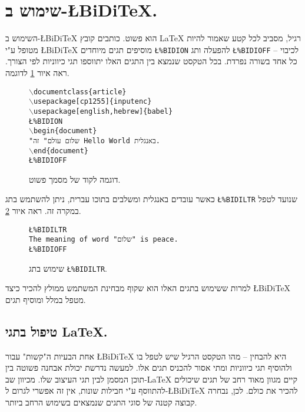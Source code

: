\documentclass[twocolumn]{article}
\newcommand{\BiDiTeX}{\L{BiDi\TeX{}}}
\newcommand{\bs}{$\backslash$}
\newcommand{\bidion}{\texttt{\L{\%BIDION}}}
\newcommand{\bidiltr}{\texttt{\L{\%BIDILTR}}}
\newcommand{\bidioff}{\texttt{\L{\%BIDIOFF}}}
\begin{document}
\section{שימוש ב-\BiDiTeX.}
השימוש ב-\BiDiTeX{} הוא פשוט. כותבים קובץ \LaTeX{} רגיל, מסביב לכל קטע שאמור להיות מטופל ע"י \BiDiTeX{} מוסיפים תגים מיוחדים \bidion{} להפעלה ותג \bidioff{} לכיבוי -- כל אחד בשורה נפרדת. בכל הטקסט שנמצא בין התגים האלו יתווספו תגי כיווניות לפי הצורך.  ראה איור  \ref{example} לדוגמה.
\begin{figure}[h]
\caption{דוגמה לקוד של מסמך פשוט.\label{example}}
\unsethebrew
\texttt{\bs documentclass\{article\}\\
\bs usepackage[cp1255]\{inputenc\}\\
\bs usepackage[english,hebrew]\{babel\}\\
\bidion\\
\bs begin\{document\}\\
\sethebrew
\sethebrew
"שלום עולם" זה Hello World באנגלית.\\
\unsethebrew
\bs end\{document\}\\
\bidioff}
\sethebrew
\end{figure}

כאשר עובדים באנגלית ומשלבים בתוכו עברית, ניתן להשתמש בתג \bidiltr{} שנועד לטפל במקרה זה. ראה איור \ref{ltr}.
\begin{figure}[h]
\caption{שימוש בתג \bidiltr.\label{ltr}}
\unsethebrew
\texttt{\bidiltr\\
The meaning of word "שלום" is peace.\\
\bidioff}
\sethebrew
\end{figure}

למרות ששימוש בתגים האלו הוא שקוף מבחינת המשתמש ממולץ להכיר כיצד \BiDiTeX{} מטפל במלל ומוסיף תגים.

\subsection{טיפול בתגי \LaTeX.}
אחת הבעיות ה"קשות" עבור \BiDiTeX{} היא להבחין -- מהו הטקסט הרגיל שיש לטפל בו ולהוסיף תגי כיווניות ומתי אסור להכניס תגים אלו. למעשה נדרשת יכולת אבחנה פשוטה בין תוכן המסמן לבין תגי העיצוב שלו. מכיוון שב-\LaTeX{} קיים מגוון מאוד רחב של תגים שיכולים להתווסף ע"י חבילות שונות, אין זה אפשרי לגרום ל-\BiDiTeX{} להכיר את כולם. לכן, נבחרה קבוצה קטנה של סוגי התגים שנמצאים בשימוש הרחב ביותר.
\end{document}
